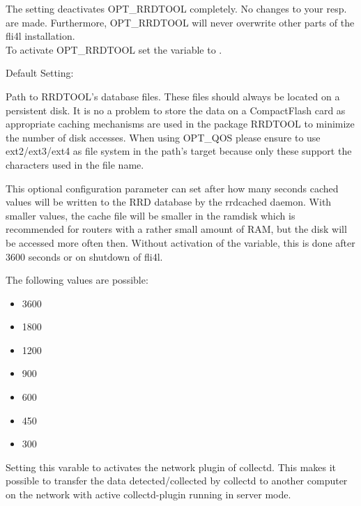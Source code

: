 \begin{description}


  The setting  deactivates OPT\_RRDTOOL completely. No changes
  to your  resp.  are made.
  Furthermore, OPT\_RRDTOOL will never overwrite other parts of the
  fli4l installation.\\
  To activate OPT\_RRDTOOL set the variable  to
  .


  Default Setting: 

  Path to RRDTOOL's database files. These files should always be located on
  a persistent disk. It is no a problem to store the data on a
  CompactFlash card as appropriate caching mechanisms are used in the
  package RRDTOOL to minimize the number of disk accesses.
  When using OPT\_QOS please ensure to use ext2/ext3/ext4 as file system in the
  path's target because only these support the characters used in the file name.


  This optional configuration parameter can set after how many seconds cached values
  will be written to the RRD database by the rrdcached daemon. With smaller values,
  the cache file will be smaller in the ramdisk which is recommended for routers
  with a rather small amount of RAM, but the disk will be accessed more often then.
  Without activation of the variable, this is done after 3600 seconds or on
  shutdown of fli4l.

  The following values are possible:
  \begin{itemize}
    \item 3600
    \item 1800
    \item 1200
    \item 900
    \item 600
    \item 450
    \item 300
  \end{itemize}



  Setting this varable to  activates the network plugin of collectd.
  This makes it possible to transfer the data detected/collected by collectd
  to another computer on the network with active collectd-plugin running in
  server mode.


\end{description}
